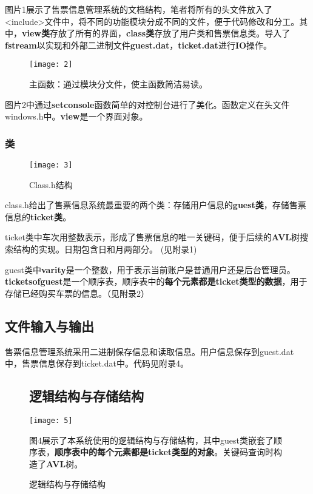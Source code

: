 \documentclass{apmcmthesis}
\begin{document}
图片1展示了售票信息管理系统的文档结构，笔者将所有的头文件放入了<include>文件中，将不同的功能模块分成不同的文件，便于代码修改和分工。其中，\textbf{view类}存放了所有的界面，\textbf{class类}存放了用户类和售票信息类。导入了\textbf{fstream}以实现和外部二进制文件\textbf{guest.dat}，\textbf{ticket.dat}进行\textbf{IO}操作。

\begin{figure}[htbp]
	\texttt{[image: 2]}
	\caption{主函数：通过模块分文件，使主函数简洁易读。}
\end{figure}

图片2中通过\textbf{setconsole}函数简单的对控制台进行了美化。函数定义在头文件windows.h中。\textbf{view}是一个界面对象。



\subsubsection{类}
\begin{figure}[htbp]
	\texttt{[image: 3]}
	\caption{Class.h结构}
\end{figure}

class.h给出了售票信息系统最重要的两个类：存储用户信息的\textbf{guest类}，存储售票信息的\textbf{ticket类}。

ticket类中车次用整数表示，形成了售票信息的唯一关键码，便于后续的\textbf{AVL}树搜索结构的实现。日期包含日和月两部分。
(见附录1)

guest类中\textbf{varity}是一个整数，用于表示当前账户是普通用户还是后台管理员。\textbf{ticketsofguest}是一个顺序表，顺序表中的\textbf{每个元素都是ticket类型的数据}，用于存储已经购买车票的信息。（见附录2）




\subsection{文件输入与输出}
售票信息管理系统采用二进制保存信息和读取信息。用户信息保存到guest.dat中，售票信息保存到ticket.dat中。代码见附录4。


\begin{figure}[htbp]
	\subsection{逻辑结构与存储结构}
	\texttt{[image: 5]}
	\caption{逻辑结构与存储结构}

图4展示了本系统使用的逻辑结构与存储结构，其中guest类嵌套了顺序表，\textbf{顺序表中的每个元素都是ticket类型的对象}。关键码查询时构造了\textbf{AVL}树。
\end{figure}
\end{document}
